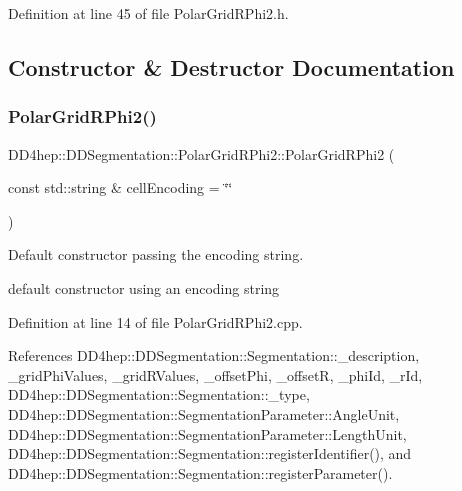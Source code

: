 Definition at line 45 of file Polar\+Grid\+R\+Phi2.\+h.



\subsection{Constructor \& Destructor Documentation}
\hypertarget{class_d_d4hep_1_1_d_d_segmentation_1_1_polar_grid_r_phi2_a88552803b42baa290fc38268bc06f099}{}\label{class_d_d4hep_1_1_d_d_segmentation_1_1_polar_grid_r_phi2_a88552803b42baa290fc38268bc06f099} 
\subsubsection{\texorpdfstring{Polar\+Grid\+R\+Phi2()}{PolarGridRPhi2()}\hspace{0.1cm}{\footnotesize\ttfamily [1/2]}}
{\footnotesize\ttfamily D\+D4hep\+::\+D\+D\+Segmentation\+::\+Polar\+Grid\+R\+Phi2\+::\+Polar\+Grid\+R\+Phi2 (\begin{DoxyParamCaption}\item[{const std\+::string \&}]{cell\+Encoding = {\ttfamily \char`\"{}\char`\"{}} }\end{DoxyParamCaption})}



Default constructor passing the encoding string. 

default constructor using an encoding string 

Definition at line 14 of file Polar\+Grid\+R\+Phi2.\+cpp.



References D\+D4hep\+::\+D\+D\+Segmentation\+::\+Segmentation\+::\+\_\+description, \+\_\+grid\+Phi\+Values, \+\_\+grid\+R\+Values, \+\_\+offset\+Phi, \+\_\+offsetR, \+\_\+phi\+Id, \+\_\+r\+Id, D\+D4hep\+::\+D\+D\+Segmentation\+::\+Segmentation\+::\+\_\+type, D\+D4hep\+::\+D\+D\+Segmentation\+::\+Segmentation\+Parameter\+::\+Angle\+Unit, D\+D4hep\+::\+D\+D\+Segmentation\+::\+Segmentation\+Parameter\+::\+Length\+Unit, D\+D4hep\+::\+D\+D\+Segmentation\+::\+Segmentation\+::register\+Identifier(), and D\+D4hep\+::\+D\+D\+Segmentation\+::\+Segmentation\+::register\+Parameter().

